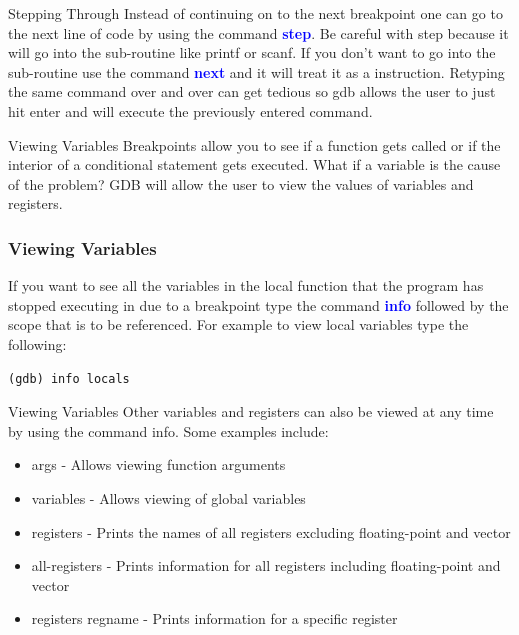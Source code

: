 \documentclass[11pt]{beamer}
\begin{document}
\begin{frame}{Stepping Through}
Instead of continuing on to the next breakpoint one can go to the next line of code by using the command \textbf{\textcolor{blue}{step}}. 
\break
\break
Be careful with step because it will go into the sub-routine like printf or scanf. If you don't want to go into the sub-routine use the command \textbf{\textcolor{blue}{next}} and it will treat it as a instruction.
\break
\break
Retyping the same command over and over can get tedious so gdb allows the user to just hit enter and will execute the previously entered command.
\end{frame}

\begin{frame}{Viewing Variables}
Breakpoints allow you to see if a function gets called or if the interior of a conditional statement gets executed.
\break
\break
What if a variable is the cause of the problem? 
\break
\break
GDB will allow the user to view the values of variables and registers.
\end{frame}


\begin{frame}[fragile]
\frametitle{Viewing Variables}
If you want to see all the variables in the local function that the program has stopped executing in due to a breakpoint type the command \textbf{\textcolor{blue}{info}} followed by the scope that is to be referenced. 
\break
\break
For example to view local variables type the following:
\begin{lstlisting}[style=BashInputStyle]
(gdb) info locals
\end{lstlisting}
\end{frame}

\begin{frame}{Viewing Variables}
Other variables and registers can also be viewed at any time by using the command info. Some examples include:
\begin{itemize}
\item args - Allows viewing function arguments
\item variables - Allows viewing of global variables
\item registers - Prints the names of all registers excluding floating-point and vector
\item all-registers - Prints information for all registers including floating-point and vector
\item registers regname - Prints information for a specific register
\end{itemize}
\end{frame}
\end{document}
